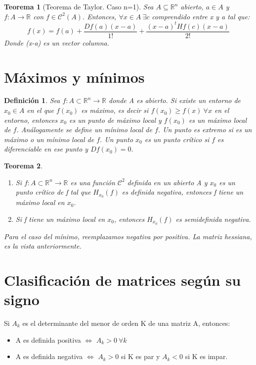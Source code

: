\documentclass[11pt, a4paper]{article}
\newcommand{\R}{\mathbb{R}}
\theoremstyle{theorem-style}
\newtheorem*{nth}{Teorema}
\theoremstyle{definition-style}
\newtheorem*{ndef}{Definición}
\theoremstyle{remark-style}
\theoremstyle{example-style}
\newenvironment{nlist}
{\begin{enumerate}
\renewcommand\labelenumi{(\emph{\roman{enumi})}}}
{\end{enumerate}}
\begin{document}
\begin{nth}[Teorema de Taylor. Caso n=1]
	Sea $A \subseteq \R^n$ abierto, $a \in A$ y $f:A \to \R$ con $f\in \mathcal{C}^2(A)$. Entonces, $\forall x \in A \ \exists c$ comprendido entre x y a tal que:
	\[
	f(x) = f(a) + \frac{Df(a)(x-a)}{1!} + \frac{(x-a)^t Hf(c)(x-a)}{2!}
	\]
	Donde (x-a) es un vector columna.
\end{nth}


\section{Máximos y mínimos}

\begin{ndef}
	Sea $f:A\subset \R^n \to \R$ donde A es abierto. Si existe un entorno de $x_0 \in A$ en el que $f(x_0)$ es máximo, es decir si $f(x_0) \geq f(x) \ \forall x$ en el entorno, entonces $x_0$ es un punto de máximo local y $f(x_0)$ es un máximo local de $f$. Análogamente se define un mínimo local de $f$. Un punto es extremo si es un máximo o un mínimo local de $f$. Un punto $x_0$ es un punto crítico si $f$ es diferenciable en ese punto y $Df(x_0) = 0$.
\end{ndef}

\begin{nth}\hfill\\
	\begin{nlist}
	\item Si $f:A \subset \R^n\to \R$ es una función $\mathcal{C}^2$ definida en un abierto A y $x_0$ es un punto crítico de f tal que $H_{x_0}(f)$ es definida negativa, entonces f tiene un máximo local en $x_0$.
	\item Si f tiene un máximo local en $x_0$, entonces $H_{x_0}(f) $ es semidefinida negativa.
\end{nlist}
Para el caso del mínimo, reemplazamos negativa por positiva. La matriz hessiana, es la vista anteriormente.
\end{nth}

\section{Clasificación de matrices según su signo}
 Si $A_k$ es el determinante del menor de orden K de una matriz A, entonces:
 \begin{itemize}
	\item A es definida positiva $\iff$ $A_k > 0 \ \forall k$
	\item A es definida negativa $\iff$ $A_k > 0$ si K es par y $A_k < 0 $ si K es impar.
\end{itemize}
\end{document}
